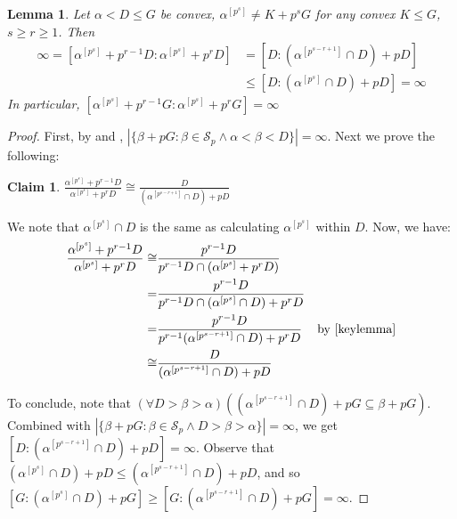 \documentclass[a4paper,11pt]{article}
\newtheorem{lemma}[theorem]{Lemma}
\newtheorem*{claim}{Claim}
\newenvironment{claimproof}{\renewcommand{\qedsymbol}{$\blacksquare$}\proof} {\endproof} %
\newcommand{\nl}{\newline}
\newcommand{\tx}{\textrm}
\begin{document}





\begin{lemma}\label{infiniterightquotientsnonconvex}
	Let $\alpha <D\leq G$ be convex, $\alpha^{[p^s]}\neq K +p^sG$ for any convex $K\leq G$, $s\geq r\geq 1$. Then 
	\begin{align*}
		\infty=[\alpha^{[p^s]}+p^{r-1}D:\alpha^{[p^s]}+p^rD] &= [D:(\alpha^{[p^{s-r+1}]}\cap D)+pD] \\
		&\leq [D:(\alpha^{[p^s]}\cap D)+pD] = \infty
	\end{align*}
	In particular, $[\alpha^{[p^s]}+p^{r-1}G:\alpha^{[p^s]}+p^rG] =\infty$
\end{lemma}
\begin{proof}
	First, by  and , $|\{\beta+pG :\beta\in\mathcal{S}_p\wedge\alpha < \beta<D\}|=\infty$.
	\nl\nl
	Next we prove the following:
	\begin{claim}
		$\frac{\alpha^{[p^s]}+p^{r-1}D}{\alpha^{[p^s]}+p^rD}\cong\frac{D}{(\alpha^{[p^{s-r+1}]}\cap D)+pD}$
	\end{claim}
	\begin{claimproof}
		We note that $\alpha^{[p^s]}\cap D$ is the same as calculating $\alpha^{[p^s]}$ within $D$. Now, we have:
		\begin{align*}
			\frac{\alpha^{[p^s]}+p^{r-1}D}{\alpha^{[p^s]}+p^rD}\cong &\frac{p^{r-1}D}{p^{r-1}D\cap(\alpha^{[p^s]}+p^rD)} \\
			=& \frac{p^{r-1}D}{p^{r-1}D\cap (\alpha^{[p^s]}\cap D)+p^rD} \\
			=&\frac{p^{r-1}D}{p^{r-1}(\alpha^{[p^{s-r+1}]}\cap D)+p^rD} & \tx{by \Cref{keylemma}} \\
			\cong& \frac{D}{(\alpha^{[p^{s-r+1}]}\cap D)+pD}
		\end{align*}
		
	\end{claimproof}
	\noindent To conclude, note that $(\forall D> \beta > \alpha)((\alpha^{[p^{s-r+1}]}\cap D)+pG\subseteq \beta+pG)$. Combined with $|\{\beta+pG :\beta\in\mathcal{S}_p\wedge D>\beta>\alpha\}|=\infty$, we get $[D:(\alpha^{[p^{s-r+1}]}\cap D)+pD]=\infty$. Observe that $(\alpha^{[p^{s}]}\cap D)+pD\leq (\alpha^{[p^{s-r+1}]}\cap D)+pD$, and so $[G:(\alpha^{[p^s]}\cap D)+pG]\geq[G:(\alpha^{[p^{s-r+1}]}\cap D)+pG]=\infty$.
\end{proof}
\end{document}

